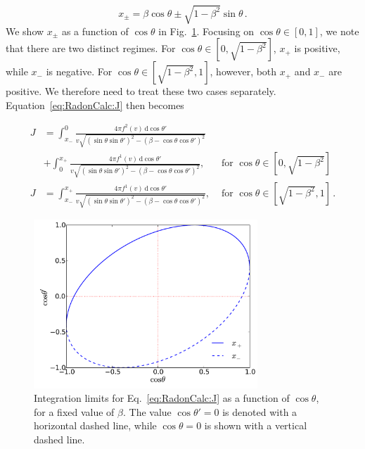 \begin{equation}
x_{\pm} = \beta\cos\theta \pm \sqrt{1-\beta^2}\sin\theta\,.
\end{equation}
We show $x_{\pm}$ as a function of $\cos\theta$ in Fig.~\ref{fig:RadonCalc:IntegLimits}. Focusing on $\cos\theta \in [0,1]$, we note that there are two distinct regimes. For $\cos\theta \in [0, \sqrt{1-\beta^2}]$, $x_+$ is positive, while $x_-$ is negative. For $\cos\theta \in [\sqrt{1-\beta^2},1]$, however, both $x_+$ and $x_-$ are positive. We therefore need to treat these two cases separately. Equation~\ref{eq:RadonCalc:J} then becomes

\begin{align}
J &= \int_{x_-}^{0} \frac{4\pi f^2(v) \, \mathrm{d}\cos\theta'}{v\sqrt{\left(\sin\theta\sin\theta'\right)^2 - \left(\beta - \cos\theta\cos\theta'\right)^2}}  \\
& +\int_{0}^{x_+} \frac{4\pi f^1(v) \, \mathrm{d}\cos\theta'}{v\sqrt{\left(\sin\theta\sin\theta'\right)^2 - \left(\beta - \cos\theta\cos\theta'\right)^2}}, & \textrm{ for } \cos\theta \in [0,\sqrt{1-\beta^2}] \nonumber\\
J &= \int_{x_-}^{x_+} \frac{4\pi f^1(v) \, \mathrm{d}\cos\theta'}{v\sqrt{\left(\sin\theta\sin\theta'\right)^2 - \left(\beta - \cos\theta\cos\theta'\right)^2}}, & \textrm{ for } \cos\theta \in [\sqrt{1-\beta^2},1]\,.
\end{align}

\begin{figure}[tbh!]
  \centering
  \includegraphics[width=0.75\textwidth]{Directional/Integlimits.pdf}
\caption[Integration limits in the calculation of the Radon transform]{Integration limits for Eq.~\ref{eq:RadonCalc:J} as a function of $\cos\theta$, for a fixed value of $\beta$. The value $\cos\theta' = 0$ is denoted with a horizontal dashed line, while $\cos\theta = 0$ is shown with a vertical dashed line.}
  \label{fig:RadonCalc:IntegLimits}
\end{figure}

